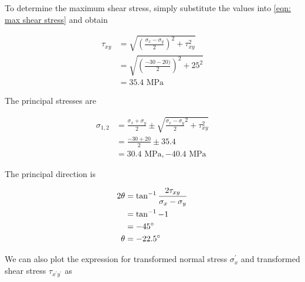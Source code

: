\documentclass[
10pt,
a4paper,
openany,
svgnames,
]{kaobook} %
\begin{document}
\begin{solution}
  To determine the maximum shear stress, simply substitute the values into \cref{eqn: max shear stress} and obtain
  
  \begin{align*}
    \tau_{xy} &= \sqrt {\left( \frac{\sigma_x - \sigma_y}{2} \right)^2 + \tau _{xy}^2}  \\ 
                 &= \sqrt {\left( \frac{-30 - 20)}{2} \right)^2 + 25^2}  \\ 
                 &= 35.4 \text{ MPa} 
  \end{align*}
  
  The principal stresses are

  \begin{align*}
    \sigma_{1,2} &= \frac{\sigma_x + \sigma _y}{2} \pm \sqrt {\frac{\sigma _x - \sigma_y}{2}^2 + \tau _{xy}^2}  \\ 
                    &= \frac{-30 + 20}{2} \pm 35.4 \\ 
                    &= 30.4 \text{ MPa}, - 40.4 \text{ MPa} 
  \end{align*}
  
  The principal direction is

  \begin{align*}
    2\theta  &= \tan^{-1}\frac{2\tau_{xy}}{\sigma_x - \sigma_y} \\ 
             &= \tan^{-1} -1 \\ 
             &= -45\degree \\
    \theta  &= -22.5\degree
  \end{align*}

  We can also plot the expression for transformed normal stress $\sigma_x^\prime $ and transformed shear stress $\tau_{x^\prime y^\prime}$ as

  \begin{figure}[H]
    \centering
  \end{figure}


\end{solution}
\end{document}
